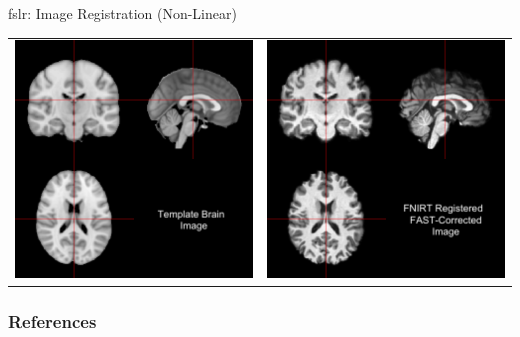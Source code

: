 \documentclass[11pt]{beamer}\usepackage[]{graphicx}\usepackage[]{color}
\begin{document}
\begin{frame}[fragile]{fslr: Image Registration (Non-Linear)}

\begin{tabular}{cc}
\includegraphics[width=0.5\linewidth]{Template_Brain.png} & \includegraphics[width=0.5\linewidth]{FNIRT_Reg_Image.png}
\end{tabular}

\end{frame}



\begin{frame}[t,allowframebreaks]
  \frametitle{References}
  \printbibliography
 \end{frame}
 
\end{document}
